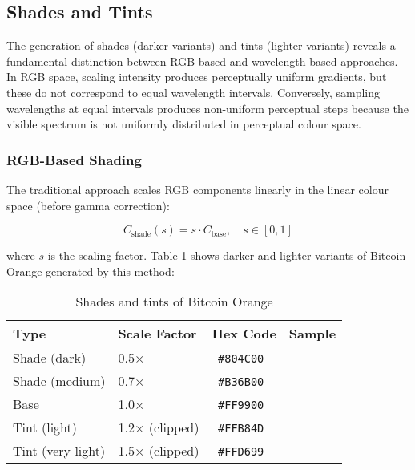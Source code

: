 \documentclass[12pt,a4paper]{article}
\newcommand{\hexcolour}[1]{%
  \definecolor{tempcolour}{HTML}{#1}%
  \texttt{\##1}~\raisebox{0.2ex}{\fboxsep=0pt\fbox{\colorbox{tempcolour}{\phantom{XX}}}}%
}
\begin{document}
\subsection{Shades and Tints}

The generation of shades (darker variants) and tints (lighter variants) reveals a fundamental distinction between RGB-based and wavelength-based approaches. In RGB space, scaling intensity produces perceptually uniform gradients, but these do not correspond to equal wavelength intervals. Conversely, sampling wavelengths at equal intervals produces non-uniform perceptual steps because the visible spectrum is not uniformly distributed in perceptual colour space.

\subsubsection{RGB-Based Shading}

The traditional approach scales RGB components linearly in the linear colour space (before gamma correction):

\begin{equation}
C_{\text{shade}}(s) = s \cdot C_{\text{base}}, \quad s \in [0, 1]
\end{equation}

where $s$ is the scaling factor. Table \ref{tab:shades-tints} shows darker and lighter variants of Bitcoin Orange generated by this method:

\begin{table}[ht]
\centering
\caption{Shades and tints of Bitcoin Orange}
\label{tab:shades-tints}
\begin{tabular}{llcc}
\toprule
\textbf{Type} & \textbf{Scale Factor} & \textbf{Hex Code} & \textbf{Sample} \\
\midrule
Shade (dark) & 0.5× & \hexcolour{804C00} & \cellcolor{orange590!50!black}\phantom{XXX} \\
Shade (medium) & 0.7× & \hexcolour{B36B00} & \cellcolor{orange590!70!black}\phantom{XXX} \\
Base & 1.0× & \hexcolour{FF9900} & \cellcolor{orange590}\phantom{XXX} \\
Tint (light) & 1.2× (clipped) & \hexcolour{FFB84D} & \cellcolor{orange590!80!white}\phantom{XXX} \\
Tint (very light) & 1.5× (clipped) & \hexcolour{FFD699} & \cellcolor{orange590!60!white}\phantom{XXX} \\
\bottomrule
\end{tabular}
\end{table}
\end{document}
